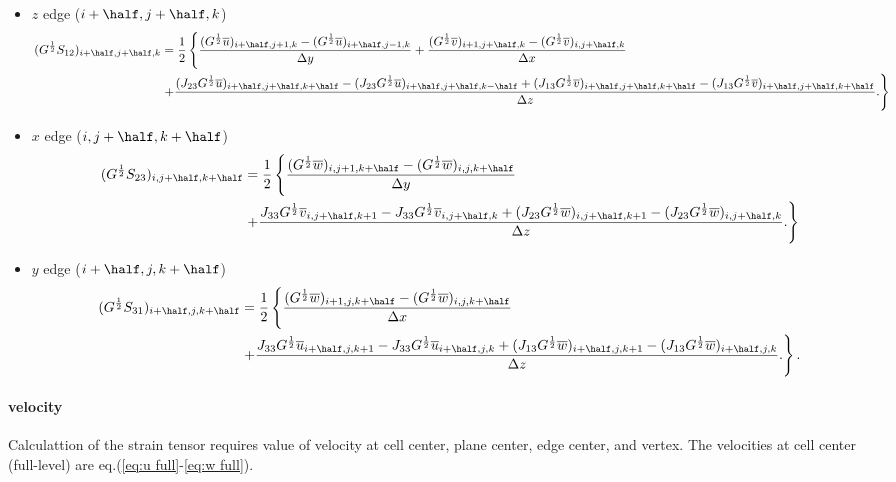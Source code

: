 \begin{itemize}
  \item $z$ edge ($i+\half,j+\half,k$)
    \begin{align}
      (G^{\frac{1}{2}}S_{12})_{i+\half,j+\half,k} &= \frac{1}{2}\left\{
      \frac{(G^{\frac{1}{2}}\overline{u})_{i+\half,j+1,k}-(G^{\frac{1}{2}}\overline{u})_{i+\half,j-1,k}}{\Delta y}
     +\frac{(G^{\frac{1}{2}}\overline{v})_{i+1,j+\half,k}-(G^{\frac{1}{2}}\overline{v})_{i,j+\half,k}}{\Delta x}  \right.\nonumber \\ &\left.
     +\frac{(J_{23}G^{\frac{1}{2}}\overline{u})_{i+\half,j+\half,k+\half}-(J_{23}G^{\frac{1}{2}}\overline{u})_{i+\half,j+\half,k-\half} + (J_{13}G^{\frac{1}{2}}\overline{v})_{i+\half,j+\half,k+\half}-(J_{13}G^{\frac{1}{2}}\overline{v})_{i+\half,j+\half,k+\half}}{\Delta z}.
      \right\}
    \end{align}

  \item $x$ edge ($i,j+\half,k+\half$)
    \begin{align}
      (G^{\frac{1}{2}}S_{23})_{i,j+\half,k+\half} &= \frac{1}{2}\left\{
      \frac{(G^{\frac{1}{2}}\overline{w})_{i,j+1,k+\half}-(G^{\frac{1}{2}}\overline{w})_{i,j,k+\half}}{\Delta y} \right. \nonumber \\ & \left.
      + \frac{J_{33}G^{\frac{1}{2}}\overline{v}_{i,j+\half,k+1}-J_{33}G^{\frac{1}{2}}\overline{v}_{i,j+\half,k} + (J_{23}G^{\frac{1}{2}}\overline{w})_{i,j+\half,k+1}-(J_{23}G^{\frac{1}{2}}\overline{w})_{i,j+\half,k}}{\Delta z}.
      \right\}
    \end{align}

  \item $y$ edge ($i+\half,j,k+\half$)
    \begin{align}
      (G^{\frac{1}{2}}S_{31})_{i+\half,j,k+\half} &= \frac{1}{2}\left\{
      \frac{(G^{\frac{1}{2}}\overline{w})_{i+1,j,k+\half}-(G^{\frac{1}{2}}\overline{w})_{i,j,k+\half}}{\Delta x} \right. \nonumber \\ & \left.
     +\frac{J_{33}G^{\frac{1}{2}}\overline{u}_{i+\half,j,k+1}-J_{33}G^{\frac{1}{2}}\overline{u}_{i+\half,j,k} + (J_{13}G^{\frac{1}{2}}\overline{w})_{i+\half,j,k+1}-(J_{13}G^{\frac{1}{2}}\overline{w})_{i+\half,j,k}}{\Delta z}.
      \right\}.
    \end{align}

\end{itemize}


\paragraph{velocity}
Calculattion of the strain tensor
requires value of velocity
at cell center, plane center, edge center, and vertex.
The velocities at cell center (full-level) are eq.(\ref{eq:u full}-\ref{eq:w full}).

